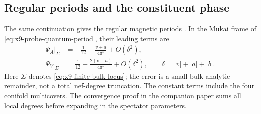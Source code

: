 \subsection{Regular periods and the constituent phase}
The same continuation gives the regular magnetic periods
\cite[Appendix~C]{Wuebben:2026quantum}. In the Mukai frame of
\eqref{eq:x9-probe-quantum-period}, their leading terms are
\begin{equation}
 \begin{aligned}
 \Psi_A|_\Sigma&=-\frac1{12}-\frac{v+a}{4\pi^2}
                          +O(\delta^2),\\
 \Psi_V|_\Sigma&=\frac1{12}+\frac{2(v+a)}{4\pi^2}
                          +O(\delta^2),
 \qquad \delta=|v|+|a|+|b|.
 \end{aligned}
 \label{eq:x9-regular-magnetic-leading}
\end{equation}
Here $\Sigma$ denotes \eqref{eq:x9-finite-bulk-locus}; the error
is a small-bulk analytic remainder, not a total nef-degree
truncation. The constant terms include the four conifold
multicovers. The convergence proof in the companion paper sums all local
degrees before expanding in the spectator parameters.

